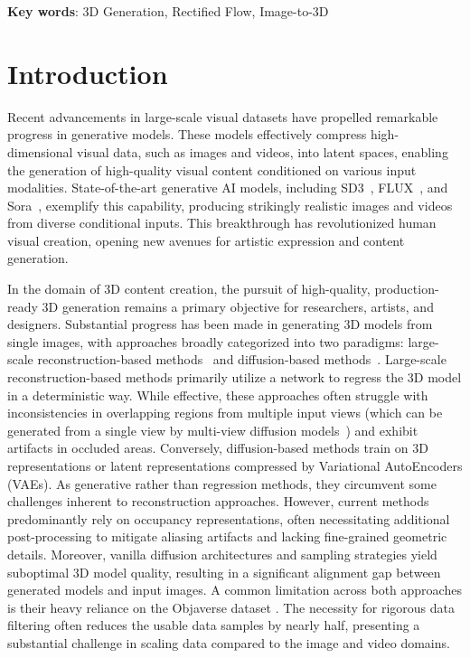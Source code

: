 \textbf{Key words}: 3D Generation, Rectified Flow, Image-to-3D 
\section{Introduction}
Recent advancements in large-scale visual datasets \cite{schuhmann2022laion, bain2021frozen, wang2023internvid} have propelled remarkable progress in generative models. These models effectively compress high-dimensional visual data, such as images and videos, into latent spaces, enabling the generation of high-quality visual content conditioned on various input modalities. State-of-the-art generative AI models, including SD3~\cite{esser2024scaling}, FLUX~\cite{flux}, and Sora~\cite{videoworldsimulators2024}, exemplify this capability, producing strikingly realistic images and videos from diverse conditional inputs. This breakthrough has revolutionized human visual creation, opening new avenues for artistic expression and content generation.

In the domain of 3D content creation, the pursuit of high-quality, production-ready 3D generation remains a primary objective for researchers, artists, and designers. Substantial progress has been made in generating 3D models from single images, with approaches broadly categorized into two paradigms: large-scale reconstruction-based methods~\cite{hong2023lrm,li2023instant3d,wang2023pf,xu2023dmv3d,zhang2024gs,wei2024meshlrm,xu2024instantmesh,wang2024crm,tochilkin2024triposr,zou2024triplane} and diffusion-based methods~\cite{zhang20233dshape2vecset,zhao2024michelangelo,zhang2024clay,wu2024direct3d,li2024craftsman}.
Large-scale reconstruction-based methods primarily utilize a network to regress the 3D model in a deterministic way. While effective, these approaches often struggle with inconsistencies in overlapping regions from multiple input views (which can be generated from a single view by multi-view diffusion models~\cite{shi2023mvdream,wang2023imagedream,liu2023unidream}) and exhibit artifacts in occluded areas.
Conversely, diffusion-based methods train on 3D representations or latent representations compressed by Variational AutoEncoders (VAEs). As generative rather than regression methods, they circumvent some challenges inherent to reconstruction approaches. However, current methods predominantly rely on occupancy representations, often necessitating additional post-processing to mitigate aliasing artifacts and lacking fine-grained geometric details. Moreover, vanilla diffusion architectures and sampling strategies yield suboptimal 3D model quality, resulting in a significant alignment gap between generated models and input images.
A common limitation across both approaches is their heavy reliance on the Objaverse dataset \cite{deitke2023objaverse}. The necessity for rigorous data filtering often reduces the usable data samples by nearly half, presenting a substantial challenge in scaling data compared to the image and video domains.


